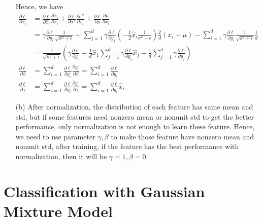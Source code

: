 \documentclass[12pt,a4paper]{article}
\begin{document}
\begin{enumerate}
\[        \]
        Hence, we have 
        \begin{align*}
            \frac{\partial \ell}{\partial x_{i}}
                &= \frac{\partial \ell}{\partial \hat{x}_{i}} \frac{\partial \hat{x}_{i}}{\partial x_{i}}+\frac{\partial \ell}{\partial \sigma^{2}} \frac{\partial \sigma^{2}}{\partial x_{i}} + \frac{\partial \ell}{\partial \mu} \frac{\partial \mu}{\partial x_{i}}\\
                &= \gamma \frac{\partial \ell}{\partial y_{i}}\frac{1}{\sqrt{\sigma^{2}+\epsilon}} + \sum_{j=1}^{d} \gamma \frac{\partial \ell}{\partial y_{j}}(-\frac{1}{2}\hat{x}_{i}\frac{1}{\sigma^{2}+\epsilon}) \frac{2}{d} (x_{i}- \mu) -\sum_{i=1}^{d} \gamma \frac{\partial \ell}{\partial y_{i}}\frac{1}{\sqrt{\sigma^{2}+\epsilon}}\frac{1}{d}\\
                &= \frac{1}{\sqrt{\sigma^{2}+\epsilon}} (\gamma \frac{\partial \ell}{\partial y_{i}} - \frac{1}{d} \hat{x}_{1} \sum_{j=1}^{d} \gamma \frac{\partial \ell}{\partial y_{j}}\hat{x}_{j} - \frac{1}{d}\sum_{j=1}^{d}\gamma \frac{\partial \ell}{\partial y_{j}})\\
            \frac{\partial \ell}{\partial \beta} 
                &= \sum_{i=1}^{d}\frac{\partial \ell}{\partial y_{i}} \frac{\partial y_{i}}{\partial \beta} = \sum_{i=1}^{d}\frac{\partial \ell}{\partial y_{i}}\\
            \frac{\partial \ell}{\partial \gamma} 
                &= \sum_{i=1}^{d}\frac{\partial \ell}{\partial y_{i}} \frac{\partial y_{i}}{\partial \gamma} = \sum_{i=1}^{d} \frac{\partial \ell}{\partial y_{i}}\hat{x}_{i}
        \end{align*}
    \item[(b)]
        After normalization, the distribution of each feature has same mean and std, but if some features need nonzero mean or nonunit std to get the better performance, only normalization is not enough to learn these feature.
        Hence, we need to use parameter $\gamma, \beta$ to make those feature have nonzero mean and nonunit std, after training, if the feature has the best performance with normalization, then it will be $\gamma=1, \beta=0$.
\end{enumerate}

\section{Classification with Gaussian Mixture Model}    
\end{document}
